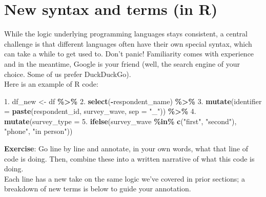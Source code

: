 \documentclass[
]{book}
\newenvironment{Shaded}{\begin{snugshade}}{\end{snugshade}}
\newcommand{\AttributeTok}[1]{\textcolor[rgb]{0.13,0.29,0.53}{#1}}
\newcommand{\FloatTok}[1]{\textcolor[rgb]{0.00,0.00,0.81}{#1}}
\newcommand{\FunctionTok}[1]{\textcolor[rgb]{0.13,0.29,0.53}{\textbf{#1}}}
\newcommand{\NormalTok}[1]{#1}
\newcommand{\OtherTok}[1]{\textcolor[rgb]{0.56,0.35,0.01}{#1}}
\newcommand{\SpecialCharTok}[1]{\textcolor[rgb]{0.81,0.36,0.00}{\textbf{#1}}}
\newcommand{\StringTok}[1]{\textcolor[rgb]{0.31,0.60,0.02}{#1}}
\begin{document}
\section{New syntax and terms (in R)}\label{new-syntax-and-terms-in-r}

While the logic underlying programming languages stays consistent, a central challenge is that different languages often have their own special syntax, which can take a while to get used to. Don't panic! Familiarity comes with experience and in the meantime, Google is your friend (well, the search engine of your choice. Some of us prefer DuckDuckGo).\\

Here is an example of R code:

\begin{Shaded}
\begin{Highlighting}[]
\FloatTok{1.}\NormalTok{  df\_new }\OtherTok{\textless{}{-}}\NormalTok{ df }\SpecialCharTok{\%\textgreater{}\%} 
\FloatTok{2.}    \FunctionTok{select}\NormalTok{(}\SpecialCharTok{{-}}\NormalTok{respondent\_name) }\SpecialCharTok{\%\textgreater{}\%} 
\FloatTok{3.}    \FunctionTok{mutate}\NormalTok{(}\AttributeTok{identifier =} \FunctionTok{paste}\NormalTok{(respondent\_id, survey\_wave, }\AttributeTok{sep =} \StringTok{"\_"}\NormalTok{)) }\SpecialCharTok{\%\textgreater{}\%} 
\FloatTok{4.}    \FunctionTok{mutate}\NormalTok{(}\AttributeTok{survey\_type =} 
\FloatTok{5.}           \FunctionTok{ifelse}\NormalTok{(survey\_wave }\SpecialCharTok{\%in\%} \FunctionTok{c}\NormalTok{(}\StringTok{"first"}\NormalTok{, }\StringTok{"second"}\NormalTok{), }\StringTok{"phone"}\NormalTok{, }\StringTok{"in person"}\NormalTok{))}
  
\end{Highlighting}
\end{Shaded}

\textbf{Exercise}: Go line by line and annotate, in your own words, what that line of code is doing. Then, combine these into a written narrative of what this code is doing.\\

Each line has a new take on the same logic we've covered in prior sections; a breakdown of new terms is below to guide your annotation.
\end{document}
